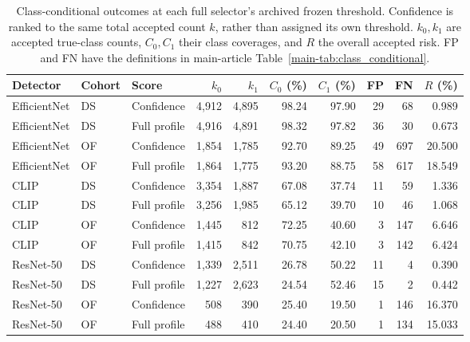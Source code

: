 \begin{table}[t]
\caption{Class-conditional outcomes at each full selector's archived frozen threshold. Confidence is ranked to the same total accepted count $k$, rather than assigned its own threshold. $k_0,k_1$ are accepted true-class counts, $C_0,C_1$ their class coverages, and $R$ the overall accepted risk. FP and FN have the definitions in main-article Table~\ref{main-tab:class_conditional}.}
\label{tab:class_frozen}
\centering\small
\setlength{\tabcolsep}{4pt}
\begin{tabular}{lllrrrrrrr}
\toprule
Detector & Cohort & Score & $k_0$ & $k_1$ & $C_0$ (\%) & $C_1$ (\%) & FP & FN & $R$ (\%) \\
\midrule
EfficientNet & DS & Confidence & 4,912 & 4,895 & 98.24 & 97.90 & 29 & 68 & 0.989 \\
EfficientNet & DS & Full profile & 4,916 & 4,891 & 98.32 & 97.82 & 36 & 30 & 0.673 \\
\addlinespace[2pt]
EfficientNet & OF & Confidence & 1,854 & 1,785 & 92.70 & 89.25 & 49 & 697 & 20.500 \\
EfficientNet & OF & Full profile & 1,864 & 1,775 & 93.20 & 88.75 & 58 & 617 & 18.549 \\
\addlinespace[2pt]
CLIP & DS & Confidence & 3,354 & 1,887 & 67.08 & 37.74 & 11 & 59 & 1.336 \\
CLIP & DS & Full profile & 3,256 & 1,985 & 65.12 & 39.70 & 10 & 46 & 1.068 \\
\addlinespace[2pt]
CLIP & OF & Confidence & 1,445 & 812 & 72.25 & 40.60 & 3 & 147 & 6.646 \\
CLIP & OF & Full profile & 1,415 & 842 & 70.75 & 42.10 & 3 & 142 & 6.424 \\
\addlinespace[2pt]
ResNet-50 & DS & Confidence & 1,339 & 2,511 & 26.78 & 50.22 & 11 & 4 & 0.390 \\
ResNet-50 & DS & Full profile & 1,227 & 2,623 & 24.54 & 52.46 & 15 & 2 & 0.442 \\
\addlinespace[2pt]
ResNet-50 & OF & Confidence & 508 & 390 & 25.40 & 19.50 & 1 & 146 & 16.370 \\
ResNet-50 & OF & Full profile & 488 & 410 & 24.40 & 20.50 & 1 & 134 & 15.033 \\
\bottomrule
\end{tabular}
\end{table}
